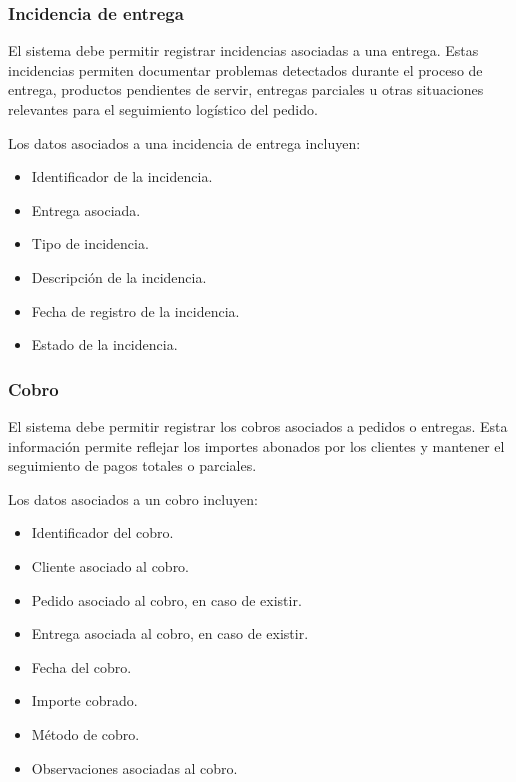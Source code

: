 \subsubsection*{Incidencia de entrega}

El sistema debe permitir registrar incidencias asociadas a una entrega. Estas incidencias permiten documentar problemas detectados durante el proceso de entrega, productos pendientes de servir, entregas parciales u otras situaciones relevantes para el seguimiento logístico del pedido.

Los datos asociados a una incidencia de entrega incluyen:

\begin{itemize}
    \item Identificador de la incidencia.
    \item Entrega asociada.
    \item Tipo de incidencia.
    \item Descripción de la incidencia.
    \item Fecha de registro de la incidencia.
    \item Estado de la incidencia.
\end{itemize}

\subsubsection*{Cobro}

El sistema debe permitir registrar los cobros asociados a pedidos o entregas. Esta información permite reflejar los importes abonados por los clientes y mantener el seguimiento de pagos totales o parciales.

Los datos asociados a un cobro incluyen:

\begin{itemize}
    \item Identificador del cobro.
    \item Cliente asociado al cobro.
    \item Pedido asociado al cobro, en caso de existir.
    \item Entrega asociada al cobro, en caso de existir.
    \item Fecha del cobro.
    \item Importe cobrado.
    \item Método de cobro.
    \item Observaciones asociadas al cobro.
\end{itemize}

